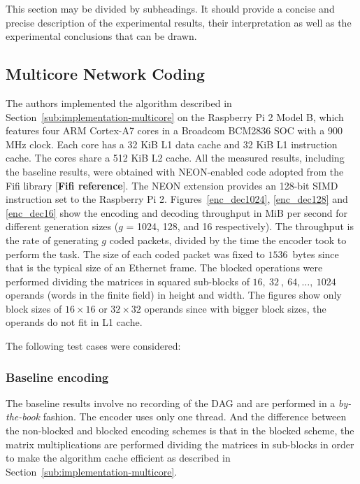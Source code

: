 \label{sec:measurements}

This section may be divided by subheadings. It should provide a concise and
precise description of the experimental results, their interpretation as well
as the experimental conclusions that can be drawn.

\subsection{Multicore Network Coding}
\label{subs:multicore-network-coding}

The authors implemented the algorithm described in
Section~\ref{sub:implementation-multicore} on the Raspberry Pi 2 Model B,
which features four ARM Cortex-A7 cores in a Broadcom BCM2836 \ac{SOC}
with a 900 MHz clock. Each core has a 32 KiB L1 data cache and 32 KiB
L1 instruction cache. The cores share a 512 KiB L2 cache. All the
measured results, including the baseline results, were obtained with
NEON-enabled code adopted from the Fifi library [\textbf{Fifi reference}].
The NEON extension provides an 128-bit \ac{SIMD} instruction set to the
Raspberry Pi 2. Figures~\ref{enc_dec1024}, \ref{enc_dec128} and
\ref{enc_dec16} show the encoding and decoding throughput in MiB per
second for different generation sizes ($g$ = 1024, 128, and 16
respectively). The throughput is the rate of generating $g$ coded packets,
divided by the time the encoder took to perform the task. The size of
each coded packet was fixed to $1536$~bytes since that is the typical
size of an Ethernet frame. The blocked operations were performed dividing
the matrices in squared sub-blocks of $16,\ 32\ ,\ 64,\ldots,\ 1024$ operands
(words in the finite field) in height and width. The figures show only
block sizes of $16 \times 16$ or $32 \times 32$ operands since with bigger
block sizes, the operands do not fit in L1 cache.

The following test cases were considered:

\subsubsection{Baseline encoding}
The baseline results involve no recording of the
\ac{DAG} and are performed in a \emph{by-the-book} fashion. The encoder uses
only one thread. And the difference between the non-blocked and blocked
encoding schemes is that in the blocked scheme, the matrix multiplications are
performed dividing the matrices in sub-blocks in order to make the algorithm
cache efficient as described in Section~\ref{sub:implementation-multicore}.

